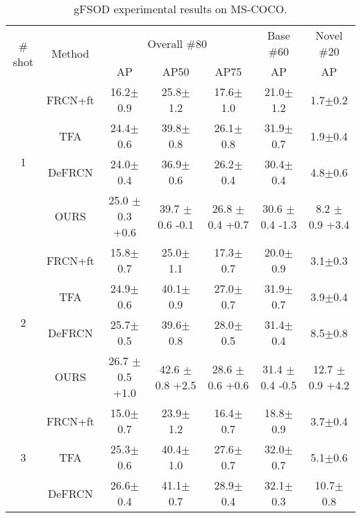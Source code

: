 \documentclass{article}
\begin{document}
\begin{table}[hbt!]
    \caption{gFSOD experimental results on MS-COCO.}
    \centering
    \begin{tabular}{c|c|ccc|c|c}
        \toprule
         \multirow{2}{*}{\# shot} & \multirow{2}{*}{Method} & \multicolumn{3}{c|}{Overall \#80} &Base \#60 & Novel \#20  \\
         && AP & AP50 &AP75 & AP&AP \\
         \hline
         \multirow{4}{*}{1} & FRCN+ft \cite{metarcnn} & 16.2$\pm$0.9& 25.8$\pm$1.2 &17.6$\pm$1.0 & 21.0$\pm$1.2 & 1.7$\pm$0.2 \\
         & TFA \cite{tfa} & 24.4$\pm$0.6 & 39.8$\pm$0.8 & 26.1$\pm$0.8 & 31.9$\pm$0.7 & 1.9$\pm$0.4 \\
         & DeFRCN \cite{defrcn} & 24.0$\pm$0.4 & 36.9$\pm$0.6 & 26.2$\pm$0.4 & 30.4$\pm$0.4 & 4.8$\pm$0.6 \\
         & \cellcolor{gray!30} OURS & \cellcolor{gray!30} 25.0 $\pm$ 0.3  {\scriptsize \color{red}+0.6}& \cellcolor{gray!30}39.7 $\pm$ 0.6  {\scriptsize \color{blue}-0.1}&\cellcolor{gray!30} 26.8 $\pm$0.4 {\scriptsize \color{red}+0.7}& \cellcolor{gray!30}30.6 $\pm$0.4 {\scriptsize \color{blue}-1.3}&\cellcolor{gray!30} 8.2 $\pm$ 0.9 {\scriptsize \color{red}+3.4}\\
         \hline
         \multirow{4}{*}{2} & FRCN+ft \cite{metarcnn} & 15.8$\pm$0.7& 25.0$\pm$1.1 &17.3$\pm$0.7 & 20.0$\pm$0.9 & 3.1$\pm$0.3 \\
         & TFA \cite{tfa} & 24.9$\pm$0.6 & 40.1$\pm$0.9 & 27.0$\pm$0.7 & 31.9$\pm$0.7 & 3.9$\pm$0.4 \\
         & DeFRCN \cite{defrcn}& 25.7$\pm$0.5 & 39.6$\pm$0.8 & 28.0$\pm$0.5 & 31.4$\pm$0.4 & 8.5$\pm$0.8 \\
         & \cellcolor{gray!30}OURS & \cellcolor{gray!30}26.7 $\pm$ 0.5 {\scriptsize \color{red}+1.0}& \cellcolor{gray!30}42.6 $\pm$ 0.8 {\scriptsize \color{red}+2.5}& \cellcolor{gray!30}28.6 $\pm$ 0.6 {\scriptsize \color{red}+0.6}& \cellcolor{gray!30}31.4 $\pm$ 0.4 {\scriptsize \color{blue}-0.5}& \cellcolor{gray!30}12.7 $\pm$ 0.9 {\scriptsize \color{red}+4.2}\\
         \hline
         \multirow{4}{*}{3} & FRCN+ft \cite{metarcnn} & 15.0$\pm$0.7& 23.9$\pm$1.2 &16.4$\pm$0.7 & 18.8$\pm$0.9 & 3.7$\pm$0.4 \\
         & TFA \cite{tfa} & 25.3$\pm$0.6 & 40.4$\pm$1.0 & 27.6$\pm$0.7 & 32.0$\pm$0.7 & 5.1$\pm$0.6 \\
         & DeFRCN \cite{defrcn}& 26.6$\pm$0.4 & 41.1$\pm$0.7 & 28.9$\pm$0.4 & 32.1$\pm$0.3 & 10.7$\pm$0.8 \\

\end{tabular}
\end{table}
\end{document}
